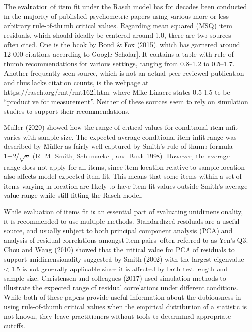 \documentclass[
  letterpaper,
  DIV=11,
  numbers=noendperiod]{scrartcl}
\begin{document}
The evaluation of item fit under the Rasch model has for decades been
conducted in the majority of published psychometric papers using various
more or less arbitrary rule-of-thumb critical values. Regarding mean
squared (MSQ) item residuals, which should ideally be centered around
1.0, there are two sources often cited. One is the book by Bond \& Fox
(2015), which has garnered around 12 000 citations according to Google
Scholar{]}. It contains a table with rule-of-thumb recommendations for
various settings, ranging from 0.8--1.2 to 0.5--1.7. Another frequently
seen source, which is not an actual peer-reviewed publication and thus
lacks citation counts, is the webpage at
\url{https://rasch.org/rmt/rmt162f.htm}, where Mike Linacre states
0.5-1.5 to be ``productive for measurement''. Neither of these sources
seem to rely on simulation studies to support their recommendations.

Müller (2020) showed how the range of critical values for conditional
item infit varies with sample size. The expected average conditional
item infit range was described by Müller as fairly well captured by
Smith's rule-of-thumb formula 1±2/\(\sqrt{n}\) (R. M. Smith, Schumacker,
and Bush 1998). However, the average range does not apply for all items,
since item location relative to sample location also affects model
expected item fit. This means that some items within a set of items
varying in location are likely to have item fit values outside Smith's
average value range while still fitting the Rasch model.

While evaluation of items fit is an essential part of evaluating
unidimensionality, it is recommended to use multiple methods.
Standardized residuals are a useful source, and usually subject to both
principal component analysis (PCA) and analysis of residual correlations
amongst item pairs, often referred to as Yen's Q3. Chou and Wang (2010)
showed that the critical value for PCA of residuals to support
unidimensionality suggested by Smith (2002) with the largest eigenvalue
\textless{} 1.5 is not generally applicable since it is affected by both
test length and sample size. Christensen and colleagues (2017) used
simulation methods to illustrate the expected range of residual
correlations under different conditions. While both of these papers
provide useful information about the dubiousness in using rule-of-thumb
critical values when the empirical distribution of a statistic is not
known, they leave practitioners without tools to determined appropriate
cutoffs.
\end{document}
